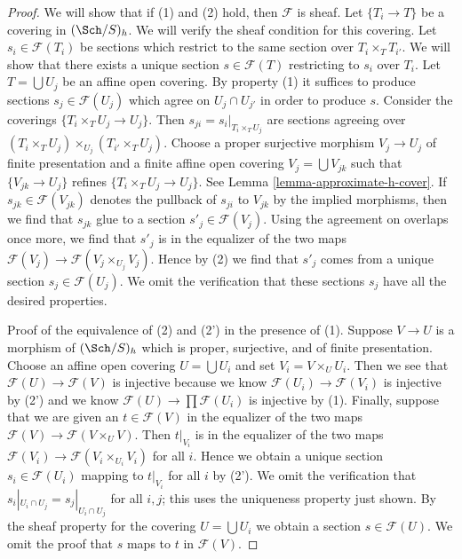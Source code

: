 \begin{proof}
We will show that if (1) and (2) hold, then $\mathcal{F}$ is sheaf.
Let $\{T_i \to T\}$ be a covering in $(\Sch/S)_h$.
We will verify the sheaf condition for this covering.
Let $s_i \in \mathcal{F}(T_i)$ be sections which restrict to the same
section over $T_i \times_T T_{i'}$. We will show that there exists a
unique section $s \in \mathcal{F}(T)$ restricting to $s_i$ over $T_i$.
Let $T = \bigcup U_j$ be an affine open covering.
By property (1) it suffices to produce sections $s_j \in \mathcal{F}(U_j)$
which agree on $U_j \cap U_{j'}$ in order to produce $s$.
Consider the coverings $\{T_i \times_T U_j \to U_j\}$.
Then $s_{ji} = s_i|_{T_i \times_T U_j}$ are sections agreeing
over $(T_i \times_T U_j) \times_{U_j} (T_{i'} \times_T U_j)$.
Choose a proper surjective morphism $V_j \to U_j$ of finite presentation
and a finite affine open covering $V_j = \bigcup V_{jk}$
such that $\{V_{jk} \to U_j\}$ refines $\{T_i \times_T U_j \to U_j\}$.
See Lemma \ref{lemma-approximate-h-cover}.
If $s_{jk} \in \mathcal{F}(V_{jk})$
denotes the pullback of $s_{ji}$ to $V_{jk}$ by the
implied morphisms, then we find that $s_{jk}$ glue to a section
$s'_j \in \mathcal{F}(V_j)$. Using the agreement on overlaps
once more, we find that $s'_j$ is in the equalizer of the two
maps $\mathcal{F}(V_j) \to \mathcal{F}(V_j \times_{U_j} V_j)$.
Hence by (2) we find that $s'_j$ comes from a unique section
$s_j \in \mathcal{F}(U_j)$. We omit the verification that these
sections $s_j$ have all the desired properties.

\medskip\noindent
Proof of the equivalence of (2) and (2') in the presence of (1).
Suppose $V \to U$ is a morphism of $(\Sch/S)_h$ which is
proper, surjective, and of finite presentation. Choose an
affine open covering $U = \bigcup U_i$ and set $V_i = V \times_U U_i$.
Then we see that $\mathcal{F}(U) \to \mathcal{F}(V)$
is injective because we know $\mathcal{F}(U_i) \to \mathcal{F}(V_i)$
is injective by (2') and we know $\mathcal{F}(U) \to \prod \mathcal{F}(U_i)$
is injective by (1). Finally, suppose that we are given an
$t \in \mathcal{F}(V)$ in the equalizer of the two maps
$\mathcal{F}(V) \to \mathcal{F}(V \times_U V)$.
Then $t|_{V_i}$ is in the equalizer of the two maps
$\mathcal{F}(V_i) \to \mathcal{F}(V_i \times_{U_i} V_i)$
for all $i$. Hence we obtain a unique section $s_i \in \mathcal{F}(U_i)$
mapping to $t|_{V_i}$ for all $i$ by (2').
We omit the verification that $s_i|_{U_i \cap U_j} = s_j|_{U_i \cap U_j}$
for all $i, j$; this uses the uniqueness property just shown.
By the sheaf property for the covering $U = \bigcup U_i$ we obtain
a section $s \in \mathcal{F}(U)$. We omit the proof that $s$
maps to $t$ in $\mathcal{F}(V)$.
\end{proof}


